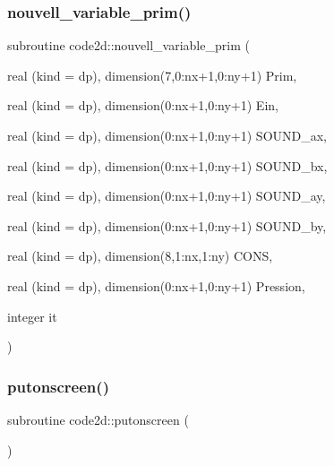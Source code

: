 \mbox{\label{main2Dv1_8f90_a7e8756401e9774b000709214edc41a76}} 
\subsubsection{\texorpdfstring{nouvell\+\_\+variable\+\_\+prim()}{nouvell\_variable\_prim()}}
{\footnotesize\ttfamily subroutine code2d\+::nouvell\+\_\+variable\+\_\+prim (\begin{DoxyParamCaption}\item[{real (kind = dp), dimension(7,0\+:nx+1,0\+:ny+1)}]{Prim,  }\item[{real (kind = dp), dimension(0\+:nx+1,0\+:ny+1)}]{Ein,  }\item[{real (kind = dp), dimension(0\+:nx+1,0\+:ny+1)}]{S\+O\+U\+N\+D\+\_\+ax,  }\item[{real (kind = dp), dimension(0\+:nx+1,0\+:ny+1)}]{S\+O\+U\+N\+D\+\_\+bx,  }\item[{real (kind = dp), dimension(0\+:nx+1,0\+:ny+1)}]{S\+O\+U\+N\+D\+\_\+ay,  }\item[{real (kind = dp), dimension(0\+:nx+1,0\+:ny+1)}]{S\+O\+U\+N\+D\+\_\+by,  }\item[{real (kind = dp), dimension(8,1\+:nx,1\+:ny)}]{C\+O\+NS,  }\item[{real (kind = dp), dimension(0\+:nx+1,0\+:ny+1)}]{Pression,  }\item[{integer}]{it }\end{DoxyParamCaption})}

\mbox{\label{main2Dv1_8f90_a8a5b072c001df1496416cc96562c9916}} 
\subsubsection{\texorpdfstring{putonscreen()}{putonscreen()}}
{\footnotesize\ttfamily subroutine code2d\+::putonscreen (\begin{DoxyParamCaption}{ }\end{DoxyParamCaption})}

